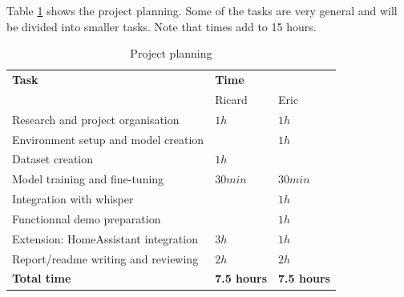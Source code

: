 \documentclass{article}
\begin{document}
Table \ref{table:timetable} shows the project planning. Some of the tasks are very general and will be divided into smaller tasks. Note that times add to 15 hours.

\begin{table}[H]
\centering
\begin{tabular}{lll}
\hline
\textbf{Task} & \textbf{Time} & \\
 & Ricard & Eric \\ \hline
Research and project organisation & $1h$ & $1h$ \\
Environment setup and model creation & & $1h$ \\
Dataset creation                   & $1h$ & \\
Model training and fine-tuning   & $30min$ & $30min$ \\
Integration with whisper & & $1h$ \\
Functionnal demo preparation & & $1h$ \\
Extension: HomeAssistant integration & $3h$ & $1h$ \\
Report/readme writing and reviewing      & $2h$ & $2h$ \\
\hline
\textbf{Total time} & \textbf{7.5 hours} & \textbf{7.5 hours} \\ \hline
\end{tabular}
\caption{Project planning}
\label{table:timetable}
\end{table}


% 


\end{document}
